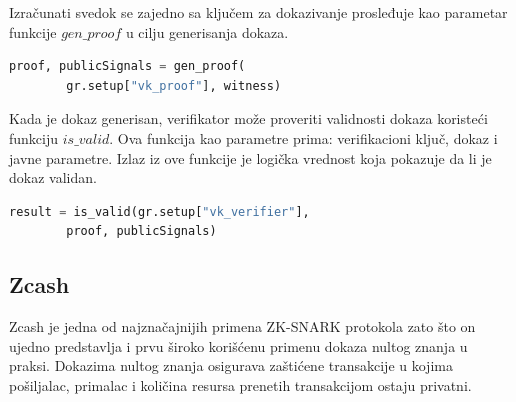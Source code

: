  
 Izračunati svedok se zajedno sa ključem za dokazivanje prosleđuje kao parametar funkcije $gen\_proof$ u cilju generisanja dokaza. 
 
\begin{english}
\begin{lstlisting}[language=Python]
proof, publicSignals = gen_proof(
		gr.setup["vk_proof"], witness)
\end{lstlisting}
\end{english}

 Kada je dokaz generisan, verifikator može  proveriti validnosti dokaza koristeći funkciju $is\_valid$. Ova funkcija kao parametre prima: verifikacioni ključ, dokaz i javne parametre. Izlaz iz ove funkcije je logička vrednost koja pokazuje da li je dokaz validan.
\begin{english}
\begin{lstlisting}[language=Python]
result = is_valid(gr.setup["vk_verifier"], 
		proof, publicSignals)
\end{lstlisting}
\end{english}
% 	
% 	
% 	
    
    \subsection{\textenglish{Zcash}}
    \textenglish{Zcash} je jedna od najznačajnijih primena \textenglish{ZK-SNARK} protokola zato što on ujedno predstavlja i prvu \v siroko kori\v s\' cenu primenu dokaza nultog znanja u praksi. Dokazima nultog znanja osigurava za\v sti\' cene transakcije u kojima po\v siljalac, primalac i koli\v cina resursa prenetih transakcijom ostaju privatni\cite{ZC, articleZcash}. \\
    

